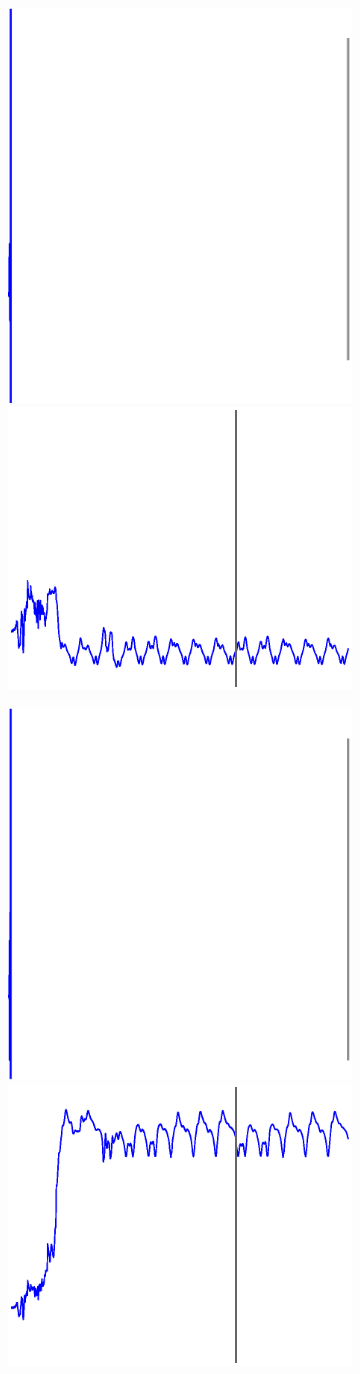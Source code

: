 \begin{figure}
\begin{subfigure}{\textwidth}
    \end{subfigure}
    
        
        
    \textbf{}\begin{subfigure}{\textwidth}
        \centering
        
        \includegraphics[trim=0cm 0cm 0cm 0cm,clip=true,height=0.1\linewidth,width=.45\linewidth]{Figures/Fig_T5/MATLAB/ST_T2_Seg3_Var_Theta1.eps}
        \includegraphics[trim=2cm 1cm 2cm 1cm,clip=true,height=0.1\linewidth,width=.45\linewidth]{Figures/Fig_T5/ImprovP/ST_T2_Seg3_Var_Theta1.eps}   

    \end{subfigure}
    
    
    \textbf{}\begin{subfigure}{\textwidth}
        \centering
        
        \includegraphics[trim=0cm 0cm 0cm 0cm,clip=true,height=0.1\linewidth,width=.45\linewidth]{Figures/Fig_T5/MATLAB/ST_T2_Seg3_Var_Theta2.eps}
        \includegraphics[trim=2cm 1cm 2cm 1cm,clip=true,height=0.1\linewidth,width=.45\linewidth]{Figures/Fig_T5/ImprovP/ST_T2_Seg3_Var_Theta2.eps}  
    
    \end{subfigure}
    
    \vspace{4em}
    
    \textbf{}\begin{subfigure}{\textwidth}
        \centering
        

\end{subfigure}
\end{figure}
